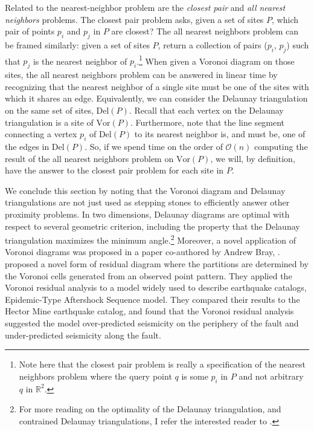 \documentclass[12pt,twoside]{reedthesis}
\begin{document}
    Related to the nearest-neighbor problem are the \emph{closest pair} and \emph{all nearest neighbors} problems. The closest pair problem asks, given a set of sites $P$, which pair of points $p_{i}$ and $p_{j}$ in $P$ are closest? The all nearest neighbors problem can be framed similarly: given a set of sites $P$, return a collection of pairs ($p_{i}$, $p_{j}$) such that $p_{j}$ is the nearest neighbor of $p_{i}$.\footnote{Note here that the closest pair problem is really a specification of the nearest neighbors problem where the query point $q$ is some $p_{i}$ in $P$ and not arbitrary $q$ in $\mathds{R}^2$.} When given a Voronoi diagram on those sites, the all nearest neighbors problem can be answered in linear time by recognizing that the nearest neighbor of a single site must be one of the sites with which it shares an edge. Equivalently, we can consider the Delaunay triangulation on the same set of sites, $\mbox{Del}(P)$. Recall that each vertex on the Delaunay triangulation is a site of $\mbox{Vor}(P)$. Furthermore, note that the line segment connecting a vertex $p_{i}$ of $\mbox{Del}(P)$ to its nearest neighbor is, and must be, one of the edges in $\mbox{Del}(P)$. So, if we spend time on the order of $\mathcal{O}(n)$ computing the result of the all nearest neighbors problem on $\mbox{Vor}(P)$, we will, by definition, have the answer to the closest pair problem for each site in $P$.\par 

    We conclude this section by noting that the Voronoi diagram and Delaunay triangulations are not just used as stepping stones to efficiently answer other proximity problems. In two dimensions, Delaunay diagrams are optimal with respect to several geometric criterion, including the property that the Delaunay triangulation maximizes the minimum angle.\footnote{For more reading on the optimality of the Delaunay triangulation, and contrained Delaunay triangulations, I refer the interested reader to \textcite{del_book}.} Moreover, a novel application of Voronoi diagrams was proposed in a paper co-authored by Andrew Bray,  \cite{bray2015}. \citeauthor{bray2015} proposed a novel form of residual diagram where the partitions are determined by the Voronoi cells generated from an observed point pattern. They applied the Voronoi residual analysis to a model widely used to describe earthquake catalogs, Epidemic-Type
    Aftershock Sequence model. They compared their results to the Hector Mine earthquake catalog, and found that the Voronoi residual analysis suggested the model over-predicted seismicity on the periphery of the fault and under-predicted seismicity along the fault. 
\end{document}

